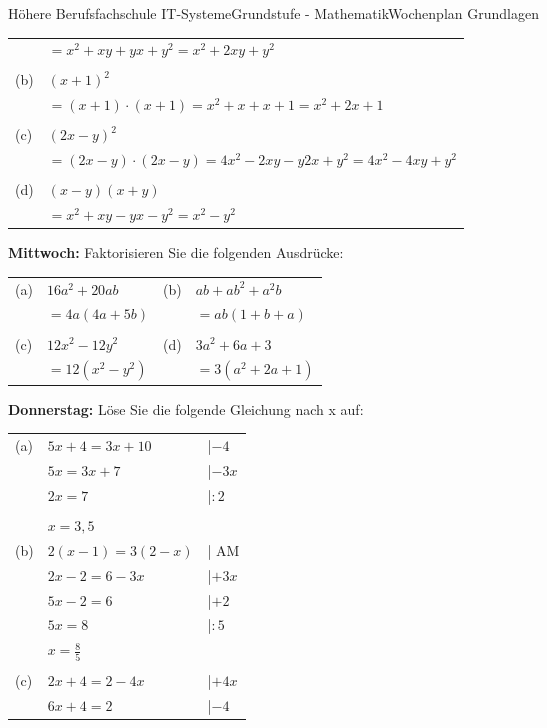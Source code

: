 \documentclass[oneside,openany,headings=optiontotoc,11pt,numbers=noenddot]{scrreprt}
\begin{document}
\begin{worksheet}{Höhere Berufsfachschule IT-Systeme}{Grundstufe - Mathematik}{Wochenplan Grundlagen}
\begin{framed}
\begin{tabularx}{\textwidth}{lX}
				& \(= x^2 +xy + yx + y^2 = x^2 +2xy + y^2\)\\\\
				(b) & \((x+1)^2\)\\
				& \(= (x+1)\cdot(x+1) = x^2 +x + x + 1 = x^2 +2x +1\)\\\\
				(c) & \((2x-y)^2\)\\
				& \(= (2x-y)\cdot(2x-y) = 4x^2 -2xy - y2x + y^2 = 4x^2 -4xy + y^2\)\\\\
				(d) & \((x-y)(x+y)\)\\
				& \(= x^2 +xy -yx -y^2 = x^2 -y^2\)
			\end{tabularx}
		\end{framed}
		\begin{framed}
			\noindent
			\textbf{Mittwoch:} Faktorisieren Sie die folgenden Ausdrücke:\\
			\begin{tabularx}{\textwidth}{lXlX}
				(a) & \(16a^2 +20ab\) & (b) & \(ab +ab^2+a^2b\)\\
				& \(= 4a(4a +5b)\) & & \(= ab(1+b+a)\)\\\\
				(c) & \(12x^2-12y^2\) & (d) & \(3a^2+6a+3\)\\
				& \(= 12(x^2 - y^2)\) & & \(= 3(a^2 +2a+1)\)
			\end{tabularx}
		\end{framed}
		\begin{framed}
			\noindent
			\textbf{Donnerstag:} Löse Sie die folgende Gleichung nach x auf:\\
			\begin{tabularx}{\textwidth}{lll}
				(a) & \(5x+4=3x+10\) & |\(-4\)\\
				& \(5x = 3x + 7\) & |\(-3x\)\\
				& \(2x = 7\) & |\(:2\)\\\\
				& \(x = 3,5\)\\
				(b) & \(2(x-1)=3(2-x)\) & | AM\\
				& \(2x - 2 = 6 -3x \) & |\(+3x\)\\
				& \(5x -2 = 6\) & |\(+2\)\\
				& \(5x = 8\) & |\(:5\)\\
				& \(x = \frac{8}{5}\)\\\\
				(c) & \(2x+4 = 2-4x\) & |\(+4x\)\\
				& \(6x+4 = 2\) & |\(-4\)\\

\end{tabularx}
\end{framed}
\end{worksheet}
\end{document}
